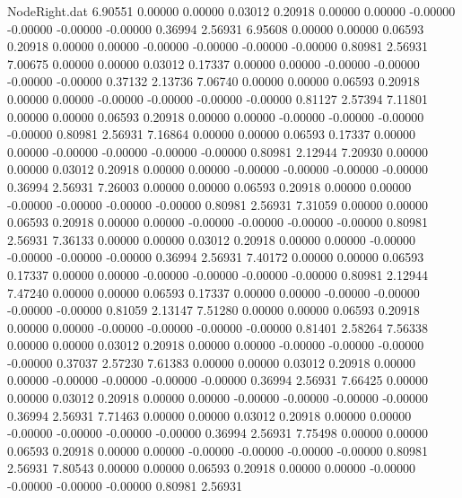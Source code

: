 \begin{filecontents}{NodeRight.dat}
   6.90551    0.00000    0.00000     0.03012    0.20918    0.00000    0.00000   -0.00000   -0.00000   -0.00000   -0.00000    0.36994    2.56931
   6.95608    0.00000    0.00000     0.06593    0.20918    0.00000    0.00000   -0.00000   -0.00000   -0.00000   -0.00000    0.80981    2.56931
   7.00675    0.00000    0.00000     0.03012    0.17337    0.00000    0.00000   -0.00000   -0.00000   -0.00000   -0.00000    0.37132    2.13736
   7.06740    0.00000    0.00000     0.06593    0.20918    0.00000    0.00000   -0.00000   -0.00000   -0.00000   -0.00000    0.81127    2.57394
   7.11801    0.00000    0.00000     0.06593    0.20918    0.00000    0.00000   -0.00000   -0.00000   -0.00000   -0.00000    0.80981    2.56931
   7.16864    0.00000    0.00000     0.06593    0.17337    0.00000    0.00000   -0.00000   -0.00000   -0.00000   -0.00000    0.80981    2.12944
   7.20930    0.00000    0.00000     0.03012    0.20918    0.00000    0.00000   -0.00000   -0.00000   -0.00000   -0.00000    0.36994    2.56931
   7.26003    0.00000    0.00000     0.06593    0.20918    0.00000    0.00000   -0.00000   -0.00000   -0.00000   -0.00000    0.80981    2.56931
   7.31059    0.00000    0.00000     0.06593    0.20918    0.00000    0.00000   -0.00000   -0.00000   -0.00000   -0.00000    0.80981    2.56931
   7.36133    0.00000    0.00000     0.03012    0.20918    0.00000    0.00000   -0.00000   -0.00000   -0.00000   -0.00000    0.36994    2.56931
   7.40172    0.00000    0.00000     0.06593    0.17337    0.00000    0.00000   -0.00000   -0.00000   -0.00000   -0.00000    0.80981    2.12944
   7.47240    0.00000    0.00000     0.06593    0.17337    0.00000    0.00000   -0.00000   -0.00000   -0.00000   -0.00000    0.81059    2.13147
   7.51280    0.00000    0.00000     0.06593    0.20918    0.00000    0.00000   -0.00000   -0.00000   -0.00000   -0.00000    0.81401    2.58264
   7.56338    0.00000    0.00000     0.03012    0.20918    0.00000    0.00000   -0.00000   -0.00000   -0.00000   -0.00000    0.37037    2.57230
   7.61383    0.00000    0.00000     0.03012    0.20918    0.00000    0.00000   -0.00000   -0.00000   -0.00000   -0.00000    0.36994    2.56931
   7.66425    0.00000    0.00000     0.03012    0.20918    0.00000    0.00000   -0.00000   -0.00000   -0.00000   -0.00000    0.36994    2.56931
   7.71463    0.00000    0.00000     0.03012    0.20918    0.00000    0.00000   -0.00000   -0.00000   -0.00000   -0.00000    0.36994    2.56931
   7.75498    0.00000    0.00000     0.06593    0.20918    0.00000    0.00000   -0.00000   -0.00000   -0.00000   -0.00000    0.80981    2.56931
   7.80543    0.00000    0.00000     0.06593    0.20918    0.00000    0.00000   -0.00000   -0.00000   -0.00000   -0.00000    0.80981    2.56931

\end{filecontents}
